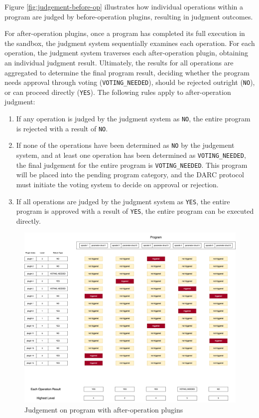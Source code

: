 \documentclass[main.tex]{subfiles}
\begin{document}
Figure \ref{fig:judgement-before-op} illustrates how individual operations within a program are judged by before-operation plugins, resulting in judgment outcomes.







For after-operation plugins, once a program has completed its full execution in the sandbox, the judgment system sequentially examines each operation. For each operation, the judgment system traverses each after-operation plugin, obtaining an individual judgment result. Ultimately, the results for all operations are aggregated to determine the final program result, deciding whether the program needs approval through voting (\texttt{VOTING\_NEEDED}), should be rejected outright (\texttt{NO}), or can proceed directly (\texttt{YES}). The following rules apply to after-operation judgment:

\begin{enumerate}
    \item If any operation is judged by the judgment system as \texttt{NO}, the entire program is rejected with a result of \texttt{NO}.
    \item If none of the operations have been determined as \texttt{NO} by the judgement system, and at least one operation has been determined as \texttt{VOTING\_NEEDED}, the final judgement for the entire program is \texttt{VOTING\_NEEDED}. This program will be placed into the pending program category, and the DARC protocol must initiate the voting system to decide on approval or rejection.
    \item If all operations are judged by the judgment system as \texttt{YES}, the entire program is approved with a result of \texttt{YES}, the entire program can be executed directly.
\end{enumerate}


\begin{figure}
    \centering
    \includegraphics[width=1\linewidth]{judgement_plugin_levels_after_ops.drawio.png}
    \caption{\label{fig:judgement-after-op}Judgement on program with after-operation plugins}
\end{figure}
\end{document}
